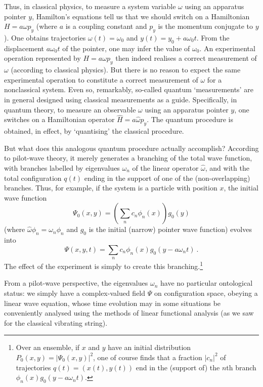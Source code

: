\documentclass[12pt]{article}%
\begin{document}
Thus, in classical physics, to measure a system variable $\omega$ using an
apparatus pointer $y$, Hamilton's equations tell us that we should switch on a
Hamiltonian $H=a\omega p_{y}$ (where $a$ is a coupling constant and $p_{y}$ is
the momentum conjugate to $y$). One obtains trajectories $\omega(t)=\omega
_{0}$ and $y(t)=y_{0}+a\omega_{0}t$. From the displacement $a\omega_{0}t$ of
the pointer, one may infer the value of $\omega_{0}$. An experimental
operation represented by $H=a\omega p_{y}$ then indeed realises a correct
measurement of $\omega$ (according to classical physics). But there is no
reason to expect the same experimental operation to constitute a correct
measurement of $\omega$ for a nonclassical system. Even so, remarkably,
so-called quantum `measurements' are in general designed using classical
measurements as a guide. Specifically, in quantum theory, to measure an
observable $\omega$ using an apparatus pointer $y$, one switches on a
Hamiltonian operator $\hat{H}=a\hat{\omega}\hat{p}_{y}$. The quantum procedure
is obtained, in effect, by `quantising' the classical procedure.

But what does this analogous quantum procedure actually accomplish? According
to pilot-wave theory, it merely generates a branching of the total wave
function, with branches labelled by eigenvalues $\omega_{n}$ of the linear
operator $\hat{\omega}$, and with the total configuration $q(t)$ ending in the
support of one of the (non-overlapping) branches. Thus, for example, if the
system is a particle with position $x$, the initial wave function%
\[
\Psi_{0}(x,y)=\left(  \sum_{n}c_{n}\phi_{n}(x)\right)  g_{0}(y)
\]
(where $\hat{\omega}\phi_{n}=\omega_{n}\phi_{n}$ and $g_{0}$ is the initial
(narrow) pointer wave function) evolves into%
\[
\Psi(x,y,t)=\sum_{n}c_{n}\phi_{n}(x)g_{0}(y-a\omega_{n}t)\ .
\]
The effect of the experiment is simply to create this branching.\footnote{Over
an ensemble, if $x$ and $y$ have an initial distribution $P_{0}%
(x,y)=\left\vert \Psi_{0}(x,y)\right\vert ^{2}$, one of course finds that a
fraction $\left\vert c_{n}\right\vert ^{2}$ of trajectories $q(t)=(x(t),y(t))$
end in the (support of) the $n$th branch $\phi_{n}(x)g_{0}(y-a\omega_{n}t)$.}

From a pilot-wave perspective, the eigenvalues $\omega_{n}$ have no particular
ontological status: we simply have a complex-valued field $\Psi$ on
configuration space, obeying a linear wave equation, whose time evolution may
in some situations be conveniently analysed using the methods of linear
functional analysis (as we saw for the classical vibrating string).
\end{document}
